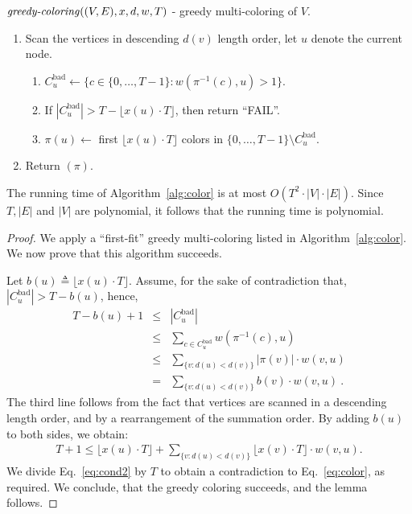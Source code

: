 \documentclass[11pt]{article}
\newenvironment{proof sketch}{\noindent {\bf Proof sketch:} }{\hfill \qed}
\newcommand{\eqdf}{\triangleq}
\newcommand{\Cbad}{C^{\text{bad}}_u}
\newcommand{\Tzo}{\{0,\ldots, T-1\}}
\newcommand{\gcolor}{\text{\emph{greedy-coloring}}}
\begin{document}
\begin{algorithm}
\caption{$\gcolor((V,E),x,d,w,T)$ - greedy multi-coloring of $V$. }
\label{alg:color}
  \begin{enumerate}
  \item Scan the vertices in descending $d(v)$ length order, let $u$ denote the current node.
    \begin{enumerate}
    \item $\Cbad \gets \{ c\in \Tzo : w(\pi^{-1}(c),u)>1 \}$.
    \item If $|\Cbad| > T-\lfloor x(u) \cdot T \rfloor$, then return
      ``FAIL''.
    \item $\pi(u) \gets $ first $\lfloor x(u) \cdot T \rfloor$ colors
      in $\Tzo\setminus \Cbad$.
    \end{enumerate}
  \item Return $(\pi)$.
  \end{enumerate}
\end{algorithm}

The running time of Algorithm~\ref{alg:color} is at most $O(T^2\cdot |V|\cdot|E|)$.
Since $T,|E|$ and $|V|$ are polynomial, it follows that the running time is polynomial.

\begin{proof}
  We apply a ``first-fit'' greedy multi-coloring listed in
  Algorithm~\ref{alg:color}.  We now prove that this algorithm
  succeeds.

  Let $b(u) \eqdf \lfloor x(u) \cdot T \rfloor$.  Assume, for the sake
  of contradiction that, $|C^{\text{bad}}_u| > T-b(u)$, hence,
    \begin{eqnarray}
      T-b(u)+1&\leq& |C^{\text{bad}}_u|\nonumber\\
     & \leq & \sum_{c \in C^{\text{bad}}_u} w(\pi^{-1}(c),u) \nonumber\\
      &\leq  & \sum_{\{v:d(u)<d(v)\}} |\pi(v)|\cdot w(v,u) \nonumber\\
      & =    & \sum_{\{v:d(u)<d(v)\}} b(v) \cdot w(v,u)\:.\label{eq:cond1}
    \end{eqnarray}
    The third line follows from the fact that vertices are scanned in
    a descending length order, and by a
    rearrangement of the summation order.
 By adding $b(u)$ to both sides, we obtain:
    \begin{align}
        T+1 \leq \lfloor x(u) \cdot T \rfloor+\sum_{\{v:d(u)<d(v)\}} \lfloor x(v) \cdot T \rfloor \cdot w(v,u). \label{eq:cond2}
    \end{align}
    We divide Eq.~\ref{eq:cond2} by $T$ to obtain a contradiction to Eq.~\ref{eq:color}, as required.
We conclude, that the greedy coloring succeeds, and the lemma follows.
\end{proof}
\end{document}
